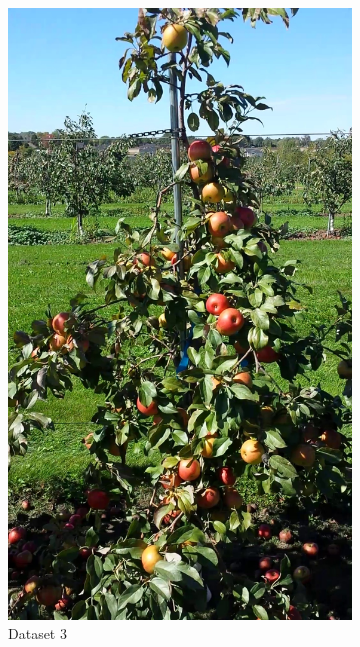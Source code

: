 \begin{figure}[ht]
\begin{subfigure}[b]{0.22\textwidth}
        \includegraphics[width=\textwidth]{figures/detection/dataset4.jpg}
        \caption{Dataset 3}
        \label{fig:validc}
    \end{subfigure}\hspace{.2cm}\begin{subfigure}[b]{0.22\textwidth}

\end{subfigure}
\end{figure}
